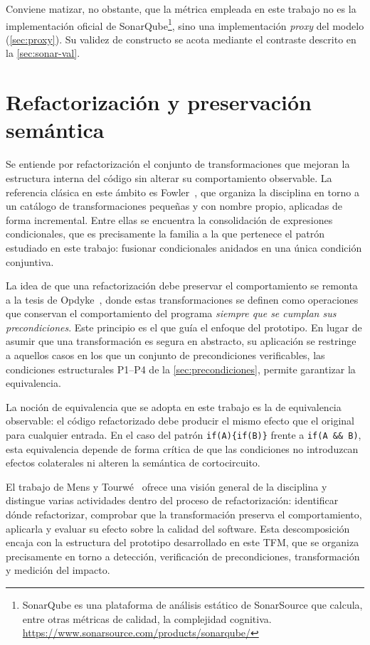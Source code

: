 Conviene matizar, no obstante, que la métrica empleada en este trabajo no es la
implementación oficial de SonarQube\footnote{SonarQube es una plataforma de
análisis estático de SonarSource que calcula, entre otras métricas de calidad,
la complejidad cognitiva. \url{https://www.sonarsource.com/products/sonarqube/}},
sino una implementación \emph{proxy} del modelo (\autoref{sec:proxy}). Su validez de constructo se acota mediante el
contraste descrito en la \autoref{sec:sonar-val}.

\section{Refactorización y preservación semántica}
\label{sec:refactor-antecedentes}

Se entiende por refactorización el conjunto de transformaciones que mejoran
la estructura interna del código sin alterar su comportamiento observable.
La referencia clásica en este ámbito es Fowler~\cite{fowler2018refactoring},
que organiza la disciplina en torno a un catálogo de transformaciones pequeñas
y con nombre propio, aplicadas de forma incremental. Entre ellas se encuentra
la consolidación de expresiones condicionales, que es precisamente la familia a
la que pertenece el patrón estudiado en este trabajo: fusionar condicionales
anidados en una única condición conjuntiva.

La idea de que una refactorización debe preservar el comportamiento se remonta
a la tesis de Opdyke~\cite{opdyke1992refactoring}, donde estas transformaciones
se definen como operaciones que conservan el comportamiento del programa
\emph{siempre que se cumplan sus precondiciones}. Este principio es el que
guía el enfoque del prototipo. En lugar de asumir que una transformación es
segura en abstracto, su aplicación se restringe a aquellos casos en los que un
conjunto de precondiciones verificables, las condiciones estructurales P1--P4
de la \autoref{sec:precondiciones}, permite garantizar la equivalencia.

La noción de equivalencia que se adopta en este trabajo es la de equivalencia
observable: el código refactorizado debe producir el mismo efecto que el
original para cualquier entrada. En el caso del patrón
\lstinline|if(A){if(B)}| frente a \lstinline|if(A && B)|, esta equivalencia
depende de forma crítica de que las condiciones no introduzcan efectos
colaterales ni alteren la semántica de cortocircuito.

El trabajo de Mens y Tourwé~\cite{10.1109/TSE.2004.1265817} ofrece una visión
general de la disciplina y distingue varias actividades dentro del proceso de
refactorización: identificar dónde refactorizar, comprobar que la
transformación preserva el comportamiento, aplicarla y evaluar su efecto sobre
la calidad del software. Esta descomposición encaja con la estructura del
prototipo desarrollado en este TFM, que se organiza precisamente en torno a
detección, verificación de precondiciones, transformación y medición del
impacto.

